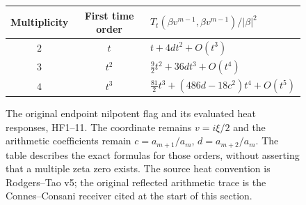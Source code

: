 \begin{figure}[p]
\centering
{}
\par\vspace{6mm}
\renewcommand{\arraystretch}{1.4}
\begin{tabular}{ccl}
\toprule
Multiplicity&First time order&$T_t(\beta v^{m-1},\beta v^{m-1})/|\beta|^2$\\
\midrule
$2$&$t$&$t+4dt^2+O(t^3)$\\
$3$&$t^2$&$\frac92t^2+36dt^3+O(t^4)$\\
$4$&$t^3$&$\frac{81}2t^3+(486d-18c^2)t^4+O(t^5)$\\
\bottomrule
\end{tabular}
\caption{The original endpoint nilpotent flag and its evaluated heat
responses, HF1--11. The coordinate remains $v=i\xi/2$ and the
arithmetic coefficients remain $c=a_{m+1}/a_m$, $d=a_{m+2}/a_m$.
The table describes the exact formulas for those orders, without
asserting that a multiple zeta zero exists. The source heat convention
is Rodgers--Tao v5; the original reflected arithmetic trace is the
Connes--Consani receiver cited at the start of this section.}
\end{figure}
